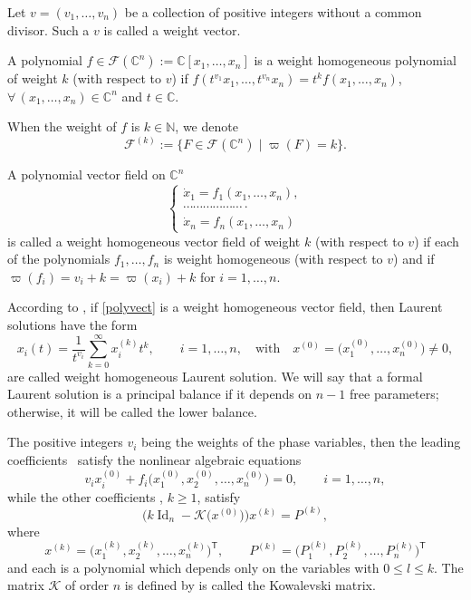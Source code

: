 \documentclass[10pt,a4paper]{amsart}
\numberwithin{equation}{section}
\begin{document}
 Let $v =
(v_1, \dots, v_n)$ be a collection of positive integers
without a common divisor. Such a $v$ is called a weight vector.
\begin{Definition}
 A polynomial $f\in \mathcal{F}(\mathbb{C}^n):=\mathbb{C}[x_1,\dots,x_n]$ is a weight homogeneous polynomial of weight
$k$ (with respect to $v$) if
$f(t^{v_1}x_1,\dots,t^{v_n}x_n)=t^kf(x_1,\dots,x_n)$, $\forall \, (x_1,\dots,x_n)\in
\mathbb{C}^n$ and $t\in \mathbb{C}$.
\end{Definition}
When the weight of $f$ is $k\in \mathbb{N}$, we denote
\[\mathcal{F}^{(k)}:= \{F\in\mathcal{F}(\mathbb{C}^n)\mid \varpi(F) = k
\}.\]

\begin{Definition}
A polynomial vector field on $\mathbb{C}^n$
\begin{equation}\label{polyvect}
\begin{cases}
\dot{x}_1 = f_1(x_1,\dots, x_n),\\
 \cdots\cdots\cdots\cdots\cdots\cdots\cdot \\
\dot{x}_n = f_n(x_1,\dots, x_n)
 \end{cases}
\end{equation}
is called a weight homogeneous vector field of weight $k$ (with
respect to $v$) if each of the polynomials $f_1,\dots,f_n$ is
weight homogeneous (with respect to $v$) and if
$\varpi(f_i )=v_i + k =\varpi(x_i)+ k$ for
$i=1,\dots,n$.
\end{Definition}

According to \cite[Proposition 7.6]{al_Moer3}, if \eqref{polyvect}
is a weight homogeneous vector field, then Laurent solutions have the
form
\[x_i(t)=\frac{1}{t^{v_i}}\sum_{k=0}^\infty x_i^{(k)}t^k,
\qquad i=1,\dots,n,
\quad \text{with} \quad x^{(0)}=\bigl(x_1^{(0)},\dots,x_n^{(0)}\bigr)\neq0,\]
 are called weight homogeneous Laurent solution. We will say that a formal Laurent solution is a principal
balance if it depends on $n-1$ free parameters; otherwise, it will
be called the lower balance.

The positive integers $v_i$ being the weights of the phase
variables, then the leading coef\-ficients~
satisfy the nonlinear algebraic equations
\begin{equation}\label{equaindicial}
 v_ix_i^{(0)}+f_i\bigl(x_1^{(0)},x_2^{(0)},\dots,x_n^{( 0)}\bigr)=0, \qquad i=1,\dots,n,
\end{equation}
while the other coefficients ,
$k\geq1$, satisfy
\[\bigl(k\operatorname{Id}_n-\mathcal{K}\bigl(x^{(
0)}\bigr)\bigr)x^{(k)}=P^{(k)},\]
 where
 \[x^{(k)}=\bigl(x_1^{(k)},x_2^{(k)},\dots,x_n^{(
k)}\bigr)^{\mathsf{T}},
\qquad P^{(k)}=\bigl(P_1^{(k)},P_2^{(k)},\dots,P_n^{(
k)}\bigr)^{\mathsf{T}}
\]
and each  is a polynomial which depends only on the variables  with ${0\leq l\leq k}$. The matrix
$\mathcal{K}$ of order $n$ is defined by
 is called the Kowalevski matrix.
\end{document}
